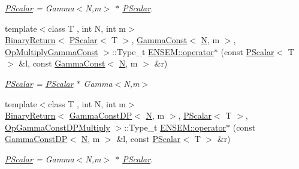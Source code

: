 \begin{DoxyCompactItemize}
\begin{DoxyCompactList}\small\item\em \mbox{\hyperlink{classENSEM_1_1PScalar}{P\+Scalar}} = Gamma$<$\+N,m$>$ $\ast$ \mbox{\hyperlink{classENSEM_1_1PScalar}{P\+Scalar}}. \end{DoxyCompactList}\item 
{\footnotesize template$<$class T , int N, int m$>$ }\\\mbox{\hyperlink{structENSEM_1_1BinaryReturn}{Binary\+Return}}$<$ \mbox{\hyperlink{classENSEM_1_1PScalar}{P\+Scalar}}$<$ T $>$, \mbox{\hyperlink{classENSEM_1_1GammaConst}{Gamma\+Const}}$<$ \mbox{\hyperlink{adat__devel_2lib_2hadron_2operator__name__util_8cc_a7722c8ecbb62d99aee7ce68b1752f337}{N}}, m $>$, \mbox{\hyperlink{structENSEM_1_1OpMultiplyGammaConst}{Op\+Multiply\+Gamma\+Const}} $>$\+::Type\+\_\+t \mbox{\hyperlink{group__primscalar_ga1f975f2be8a25d77d5b101c1db566a23}{E\+N\+S\+E\+M\+::operator$\ast$}} (const \mbox{\hyperlink{classENSEM_1_1PScalar}{P\+Scalar}}$<$ T $>$ \&l, const \mbox{\hyperlink{classENSEM_1_1GammaConst}{Gamma\+Const}}$<$ \mbox{\hyperlink{adat__devel_2lib_2hadron_2operator__name__util_8cc_a7722c8ecbb62d99aee7ce68b1752f337}{N}}, m $>$ \&r)
\begin{DoxyCompactList}\small\item\em \mbox{\hyperlink{classENSEM_1_1PScalar}{P\+Scalar}} = \mbox{\hyperlink{classENSEM_1_1PScalar}{P\+Scalar}} $\ast$ Gamma$<$\+N,m$>$ \end{DoxyCompactList}\item 
{\footnotesize template$<$class T , int N, int m$>$ }\\\mbox{\hyperlink{structENSEM_1_1BinaryReturn}{Binary\+Return}}$<$ \mbox{\hyperlink{classENSEM_1_1GammaConstDP}{Gamma\+Const\+DP}}$<$ \mbox{\hyperlink{adat__devel_2lib_2hadron_2operator__name__util_8cc_a7722c8ecbb62d99aee7ce68b1752f337}{N}}, m $>$, \mbox{\hyperlink{classENSEM_1_1PScalar}{P\+Scalar}}$<$ T $>$, \mbox{\hyperlink{structENSEM_1_1OpGammaConstDPMultiply}{Op\+Gamma\+Const\+D\+P\+Multiply}} $>$\+::Type\+\_\+t \mbox{\hyperlink{group__primscalar_gab3054a5c0ba0653b3b4069e2449e20ab}{E\+N\+S\+E\+M\+::operator$\ast$}} (const \mbox{\hyperlink{classENSEM_1_1GammaConstDP}{Gamma\+Const\+DP}}$<$ \mbox{\hyperlink{adat__devel_2lib_2hadron_2operator__name__util_8cc_a7722c8ecbb62d99aee7ce68b1752f337}{N}}, m $>$ \&l, const \mbox{\hyperlink{classENSEM_1_1PScalar}{P\+Scalar}}$<$ T $>$ \&r)
\begin{DoxyCompactList}\small\item\em \mbox{\hyperlink{classENSEM_1_1PScalar}{P\+Scalar}} = Gamma$<$\+N,m$>$ $\ast$ \mbox{\hyperlink{classENSEM_1_1PScalar}{P\+Scalar}}. \end{DoxyCompactList}\item 

\end{DoxyCompactItemize}
